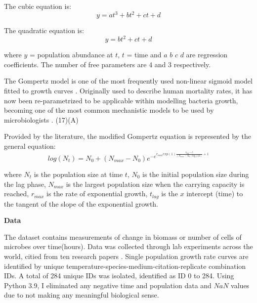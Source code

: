 \documentclass[11pt]{article}
\begin{document}
The cubic equation is:
    \begin{equation}
    y = at^3 + bt^2 + ct + d 
    \end{equation}

The quadratic equation is:
    \begin{equation}
    y = bt^2 + ct + d 
    \end{equation}

\noindent where $y$ = population abundance at $t$, $t$ = time and $a$ $b$ $c$ $d$ are regression coefficients. The number of free 
parameters are 4 and 3 respectively. 

The Gompertz model is one of the most frequently used non-linear sigmoid model fitted to growth curves \cite{gompertz_xxiv_1825}. 
Originally used to describe human mortality rates, it has now been re-parametrized to be applicable within 
modelling bacteria growth, becoming one of the most common mechanistic models to be used by microbiologists \cite{tjorve_use_2017,gibson_predicting_1988}.
(17)(A) 

Provided by the literature, the modified Gompertz equation is represented by the general equation: 
    \begin{equation}    
    log(N_{t}) = N_{0} + (N_{max} - N_{0})e^{-e^{r_{max}exp(1)\frac{t_{lag}-t}{(N_{max} - N_{0})log(10)}+1}}
    \end{equation}
   
\noindent where $N_{t}$ is the population size at time $t$, $N_{0}$ is the initial population size during the lag phase,
$N_{max}$ is the largest population size when the carrying capacity is reached, $r_{max}$ is the rate of exponential growth,
$t_{lag}$ is the $x$ intercept (time) to the tangent of the slope of the exponential growth. 

\noindent\textbf{Data}

The dataset contains measurements of change in biomass or number of cells of microbes over time(hours). Data was collected 
through lab experiments across the world, citied from ten research papers \cite{bae_growth_2014,bernhardt_metabolic_2018,roth_wheaton_1962,galarz_predicting_2016,gill_growth_1991,silva_modelling_2018,sivonen_effects_1990,stannard_temperaturegrowth_1985,zwietering_modeling_1994,phillips_relation_1987}.
Single population growth rate curves are identified by unique temperature-species-medium-citation-replicate combination IDs. A total of 284 
unique IDs was isolated, identified as ID 0 to 284. Using Python 3.9, I eliminated any negative time and population 
data and $NaN$ values due to not making any meaningful biological sense.
\end{document}
